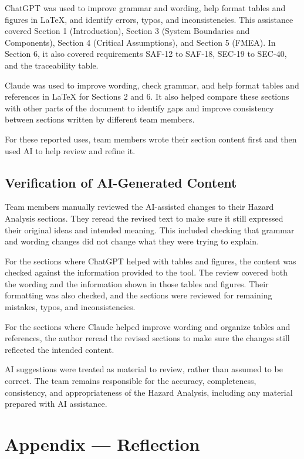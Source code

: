 \documentclass{article}
\begin{document}
ChatGPT was used to improve grammar and wording, help format tables and figures in LaTeX, and identify errors, typos, and inconsistencies. This assistance covered Section 1 (Introduction), Section 3 (System Boundaries and Components), Section 4 (Critical Assumptions), and Section 5 (FMEA). In Section 6, it also covered requirements SAF-12 to SAF-18, SEC-19 to SEC-40, and the traceability table.

Claude was used to improve wording, check grammar, and help format tables and references in LaTeX for Sections 2 and 6. It also helped compare these sections with other parts of the document to identify gaps and improve consistency between sections written by different team members.

For these reported uses, team members wrote their section content first and then used AI to help review and refine it.


\subsection{Verification of AI-Generated Content}

Team members manually reviewed the AI-assisted changes to their Hazard Analysis sections. They reread the revised text to make sure it still expressed their original ideas and intended meaning. This included checking that grammar and wording changes did not change what they were trying to explain.

For the sections where ChatGPT helped with tables and figures, the content was checked against the information provided to the tool. The review covered both the wording and the information shown in those tables and figures. Their formatting was also checked, and the sections were reviewed for remaining mistakes, typos, and inconsistencies.

For the sections where Claude helped improve wording and organize tables and references, the author reread the revised sections to make sure the changes still reflected the intended content.

AI suggestions were treated as material to review, rather than assumed to be correct. The team remains responsible for the accuracy, completeness, consistency, and appropriateness of the Hazard Analysis, including any material prepared with AI assistance.



\newpage{}

\section{Appendix --- Reflection}
\end{document}
